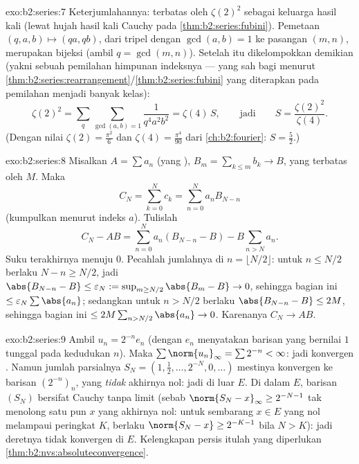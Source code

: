 \begin{solution}{exo:b2:series:7}
Keterjumlahannya: terbatas oleh $\zeta(2)^2$ sebagai keluarga hasil kali
(lewat hujah hasil kali Cauchy pada \cref{thm:b2:series:fubini}).
Pemetaan $(q, a, b) \mapsto (qa, qb)$, dari tripel dengan $\gcd(a, b) =
1$ ke pasangan $(m, n)$, merupakan bijeksi (ambil $q = \gcd(m,n)$).
Setelah  itu dikelompokkan demikian (yakni sebuah
pemilahan himpunan indeksnya --- yang sah bagi 
menurut \cref{thm:b2:series:rearrangement}/\cref{thm:b2:series:fubini}
yang diterapkan pada pemilahan menjadi  banyak kelas):
\[
\zeta(2)^2 = \sum_{q} \sum_{\gcd(a,b)=1} \frac{1}{q^4 a^2 b^2}
= \zeta(4)\, S,
\qquad\text{jadi}\qquad
S = \frac{\zeta(2)^2}{\zeta(4)} .
\]
(Dengan nilai $\zeta(2) = \frac{\pi^2}{6}$ dan
$\zeta(4) = \frac{\pi^4}{90}$ dari
\cref{ch:b2:fourier}: $S = \frac{5}{2}$.)
\end{solution}

\begin{solution}{exo:b2:series:8}
Misalkan $A = \sum a_n$ (yang ), $B_m = \sum_{k\leq m} b_k \to B$,
yang terbatas oleh $M$. Maka
\[
C_N = \sum_{k=0}^{N} c_k = \sum_{n=0}^{N} a_n B_{N-n}
\]
(kumpulkan menurut indeks $a$). Tulislah
\[
C_N - AB = \sum_{n=0}^{N} a_n (B_{N-n} - B) - B\sum_{n > N} a_n .
\]
Suku terakhirnya menuju $0$. Pecahlah jumlahnya di $n = \lfloor N/2
\rfloor$: untuk $n \leq N/2$ berlaku $N - n \geq N/2$, jadi
$\abs{B_{N-n} - B} \leq \varepsilon_N := \sup_{m \geq N/2}\abs{B_m - B}
\to 0$, sehingga bagian ini $\leq \varepsilon_N \sum\abs{a_n}$;
sedangkan untuk $n > N/2$ berlaku $\abs{B_{N-n} - B} \leq 2M$, sehingga
bagian ini $\leq 2M \sum_{n > N/2} \abs{a_n} \to 0$. Karenanya $C_N \to AB$.
\end{solution}

\begin{solution}{exo:b2:series:9}
Ambil $u_n = 2^{-n} e_n$ (dengan $e_n$ menyatakan barisan yang bernilai
$1$ tunggal pada kedudukan $n$). Maka $\sum \norm{u_n}_\infty = \sum
2^{-n} < \infty$: jadi konvergen . Namun jumlah parsialnya $S_N =
(1, \tfrac12, \dots, 2^{-N}, 0, \dots)$ mestinya konvergen ke
barisan $(2^{-n})_n$, yang \emph{tidak} akhirnya nol:
jadi di luar $E$. Di dalam $E$, barisan $(S_N)$ bersifat Cauchy tanpa
limit (sebab $\norm{S_N - x}_\infty \geq 2^{-N-1}$ tak menolong satu pun
$x$ yang akhirnya nol: untuk sembarang $x \in E$ yang nol melampaui
peringkat $K$, berlaku $\norm{S_N - x} \geq 2^{-K-1}$ bila $N > K$):
jadi deretnya tidak konvergen di $E$. Kelengkapan persis itulah yang
diperlukan \cref{thm:b2:nvs:absoluteconvergence}.
\end{solution}

